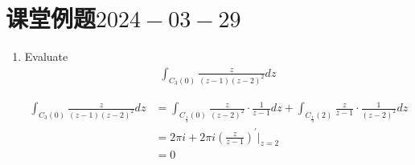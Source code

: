 \section{课堂例题$2024-03-29$}
\begin{enumerate}
	\item Evaluate 
	\begin{align}
		\int_{C_{3}(0)}{\frac{z}{(z - 1)(z - 2)^2} dz}
	\end{align}
	
	\vspace{2em}
	\begin{solution}
		\begin{align}
			\int_{C_{3}(0)}{\frac{z}{(z - 1)(z - 2)^2} dz}
			&= \int_{C_{\frac{1}{3}}(0)}{\frac{z}{(z - 2)^2} \cdot \frac{1}{z - 1} dz} + \int_{C_{\frac{1}{3}}(2)}{\frac{z}{z - 1} \cdot \frac{1}{(z - 2)^2} dz} \\
			&= 2\pi i + 2\pi i \left( \frac{z}{z - 1} \right)^{'} \Big|_{z = 2} \\
			&= 0
		\end{align}
	\end{solution}
\end{enumerate}






	\ifx\allfiles\undefined

\fi